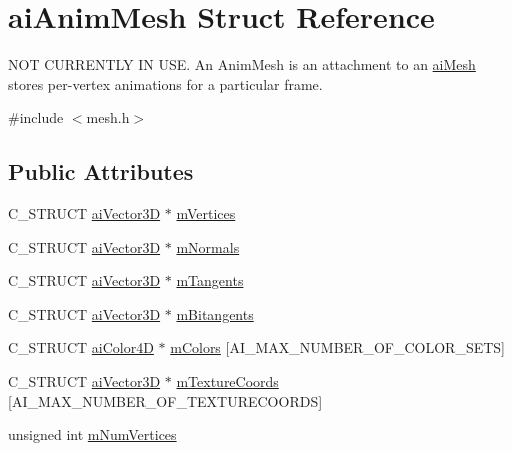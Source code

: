 \hypertarget{structai_anim_mesh}{}\section{ai\+Anim\+Mesh Struct Reference}
\label{structai_anim_mesh}


N\+OT C\+U\+R\+R\+E\+N\+T\+LY IN U\+SE. An Anim\+Mesh is an attachment to an \hyperlink{structai_mesh}{ai\+Mesh} stores per-\/vertex animations for a particular frame.  




{\ttfamily \#include $<$mesh.\+h$>$}

\subsection*{Public Attributes}
\begin{DoxyCompactItemize}
\item 
C\+\_\+\+S\+T\+R\+U\+CT \hyperlink{structai_vector3_d}{ai\+Vector3D} $\ast$ \hyperlink{structai_anim_mesh_a0ac2dd4c1afd23e6a9293b1d0ded3060}{m\+Vertices}
\item 
C\+\_\+\+S\+T\+R\+U\+CT \hyperlink{structai_vector3_d}{ai\+Vector3D} $\ast$ \hyperlink{structai_anim_mesh_a64a07a8c5c419b1e006c5302bca4d334}{m\+Normals}
\item 
C\+\_\+\+S\+T\+R\+U\+CT \hyperlink{structai_vector3_d}{ai\+Vector3D} $\ast$ \hyperlink{structai_anim_mesh_a95dcc49c6d5ecc570ceb54552a0a9625}{m\+Tangents}
\item 
C\+\_\+\+S\+T\+R\+U\+CT \hyperlink{structai_vector3_d}{ai\+Vector3D} $\ast$ \hyperlink{structai_anim_mesh_a7d60acf4d2b4b59dcc6c88956bfae85f}{m\+Bitangents}
\item 
C\+\_\+\+S\+T\+R\+U\+CT \hyperlink{structai_color4_d}{ai\+Color4D} $\ast$ \hyperlink{structai_anim_mesh_a4f062d9fac71c6b367fdf0f8638e1ca5}{m\+Colors} \mbox{[}A\+I\+\_\+\+M\+A\+X\+\_\+\+N\+U\+M\+B\+E\+R\+\_\+\+O\+F\+\_\+\+C\+O\+L\+O\+R\+\_\+\+S\+E\+TS\mbox{]}
\item 
C\+\_\+\+S\+T\+R\+U\+CT \hyperlink{structai_vector3_d}{ai\+Vector3D} $\ast$ \hyperlink{structai_anim_mesh_ad24a0451adeb845a53eb2351b9462e0a}{m\+Texture\+Coords} \mbox{[}A\+I\+\_\+\+M\+A\+X\+\_\+\+N\+U\+M\+B\+E\+R\+\_\+\+O\+F\+\_\+\+T\+E\+X\+T\+U\+R\+E\+C\+O\+O\+R\+DS\mbox{]}
\item 
unsigned int \hyperlink{structai_anim_mesh_a6bb0d45317a1bbea7f2b7f8191d0c436}{m\+Num\+Vertices}
\end{DoxyCompactItemize}


